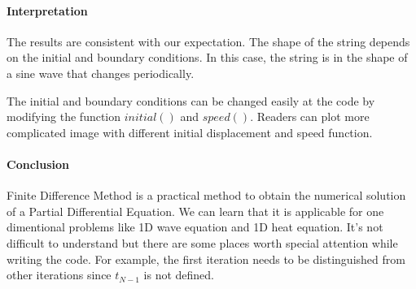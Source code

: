 \documentclass[11pt]{article}
\begin{document}
\paragraph{Interpretation}

The results are consistent with our expectation. The shape of the string depends on the initial and boundary conditions. In this case, the string is in the shape of a sine wave that changes periodically. 

The initial and boundary conditions can be changed easily at the code by modifying the function $initial()$ and $speed()$. Readers can plot more complicated image with different initial displacement and speed function.

\paragraph{Conclusion}
Finite Difference Method is a practical method to obtain the numerical solution of a Partial Differential Equation. We can learn that it is applicable for one dimentional problems like 1D wave equation and 1D heat equation. It's not difficult to understand but there are some places worth special attention while writing the code. For example, the first iteration needs to be distinguished from other iterations since $t_{N-1}$ is not defined. 
\end{document}
